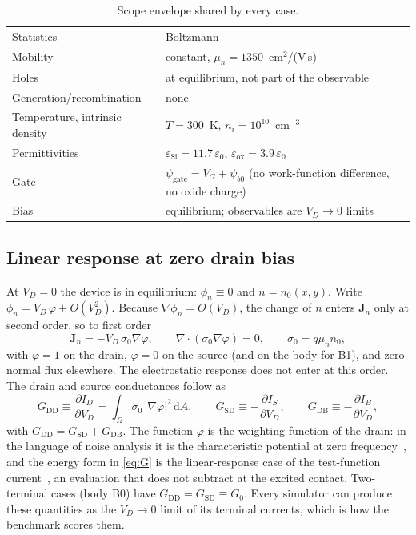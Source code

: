 \documentclass[11pt]{article}
\newcommand{\G}[1]{G_{\mathrm{#1}}}
\begin{document}
\begin{table}[t]
\centering\small
\caption{Scope envelope shared by every case.}\label{tab:scope}
\begin{tabular}{@{}ll@{}}
\toprule
Statistics & Boltzmann \\
Mobility & constant, $\mu_n = 1350$~cm$^2$/(V\,s) \\
Holes & at equilibrium, not part of the observable \\
Generation/recombination & none \\
Temperature, intrinsic density & $T = 300$~K, $n_i = 10^{10}$~cm$^{-3}$ \\
Permittivities & $\varepsilon_\mathrm{Si} = 11.7\,\varepsilon_0$, $\varepsilon_\mathrm{ox} = 3.9\,\varepsilon_0$ \\
Gate & $\psi_\mathrm{gate} = V_G + \psi_{b0}$ (no work-function difference, no oxide charge) \\
Bias & equilibrium; observables are $V_D \to 0$ limits \\
\bottomrule
\end{tabular}
\end{table}

\subsection{Linear response at zero drain bias}\label{sec:linear}
At $V_D = 0$ the device is in equilibrium: $\phi_n \equiv 0$ and $n = n_0(x,y)$. Write $\phi_n = V_D\,\varphi + O(V_D^2)$.
Because $\nabla\phi_n = O(V_D)$, the change of $n$ enters $\mathbf{J}_n$ only at second order, so to first order
\begin{equation}
\mathbf{J}_n = -V_D\,\sigma_0\nabla\varphi, \qquad \nabla\cdot(\sigma_0\nabla\varphi) = 0, \qquad \sigma_0 = q\mu_n n_0,
\label{eq:lin}
\end{equation}
with $\varphi = 1$ on the drain, $\varphi = 0$ on the source (and on the body for B1), and zero normal flux elsewhere.
The electrostatic response does not enter at this order. The drain and source conductances follow as
\begin{equation}
\G{DD} \equiv \frac{\partial I_D}{\partial V_D} = \int_\Omega \sigma_0\,|\nabla\varphi|^2\,\mathrm{d}A, \qquad
\G{SD} \equiv -\frac{\partial I_S}{\partial V_D}, \qquad \G{DB} \equiv -\frac{\partial I_B}{\partial V_D},
\label{eq:G}
\end{equation}
with $\G{DD} = \G{SD} + \G{DB}$. The function $\varphi$ is the weighting function of the drain: in the language of noise
analysis it is the characteristic potential at zero frequency~\cite{Nah2003}, and the energy form in \cref{eq:G} is the
linear-response case of the test-function current~\cite{FarrellPeschka2019}, an evaluation that does not subtract at the
excited contact. Two-terminal cases
(body B0) have $\G{DD} = \G{SD} \equiv G_0$. Every simulator can produce these quantities as the $V_D \to 0$ limit of its
terminal currents, which is how the benchmark scores them.
\end{document}
